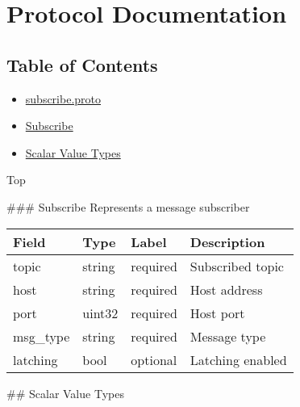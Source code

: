 \section{Protocol Documentation}\label{protocol-documentation}

\subsection{Table of Contents}\label{table-of-contents}

\begin{itemize}
\item
  \hyperref[subscribe.proto]{subscribe.proto}
\item
  \hyperref[experimot.msgs.Subscribe]{Subscribe}
\item
  \hyperref[scalar-value-types]{Scalar Value Types}
\end{itemize}

Top


 \#\#\# Subscribe Represents a message subscriber

\begin{longtable}[c]{@{}llll@{}}
\toprule
Field & Type & Label & Description\tabularnewline
\midrule
\endhead
topic & string & required & Subscribed topic\tabularnewline
host & string & required & Host address\tabularnewline
port & uint32 & required & Host port\tabularnewline
msg\_type & string & required & Message type\tabularnewline
latching & bool & optional & Latching enabled\tabularnewline
\bottomrule
\end{longtable}

 \#\# Scalar Value Types

